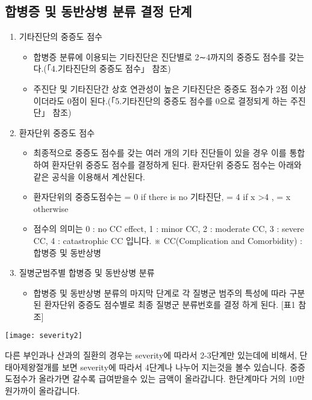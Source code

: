 \subsection{합병증 및 동반상병 분류 결정 단계}
\begin{enumerate}[(1)]\tightlist 
\item 기타진단의 중증도 점수
	\begin{itemize}\tightlist
	\item 합병증 분류에 이용되는 기타진단은 진단별로 2∼4까지의 중증도 점수를 갖는다.(「4.기타진단의 중증도 점수」 참조)
	\item 주진단 및 기타진단간 상호 연관성이 높은 기타진단은 중증도 점수가 2점 이상이더라도 0점이 된다.(「5.기타진단의 중증도 점수를 0으로 결정되게 하는 주진단」 참조)
	\end{itemize}
\item 환자단위 중증도 점수
	\begin{itemize}\tightlist
	\item 최종적으로 중증도 점수를 갖는 여러 개의 기타 진단들이 있을 경우 이를 통합하여 환자단위 중증도 점수를 결정하게 된다. 환자단위 중증도 점수는 아래와 같은 공식을 이용해서 계산된다.
	\item 환자단위의 중증도점수는  = 0 if there is no 기타진단, = 4 if x >4 , = x otherwise
	\item 점수의 의미는 0 : no CC effect, 1 : minor CC, 2 : moderate CC, 3 : severe CC, 4 : catastrophic CC 입니다. ※ CC(Complication and Comorbidity) : 합병증 및 동반상병
	\end{itemize}

\item 질병군범주별 합병증 및 동반상병 분류
	\begin{itemize}\tightlist
	\item 합병증 및 동반상병 분류의 마지막 단계로 각 질병군 범주의 특성에
따라 구분된 환자단위 중증도 점수별로 최종 질병군 분류번호를 결정
하게 된다. [표1 참조]
	\end{itemize}
\end{enumerate}
\prezi{\clearpage}
\texttt{[image: severity2]}	
\par
\medskip
다른 부인과나 산과의 질환의 경우는 severity에 따라서 2-3단계만 있는데에 비해서, 단태아제왕절개를 보면 severity에 따라서 4단계나 나누어 지는것을 볼수 있습니다. 중증도점수가 올라가면 갈수록 급여받을수 있는 금액이 올라갑니다. 한단계마다 거의 10만원가까이 올라갑니다.%
